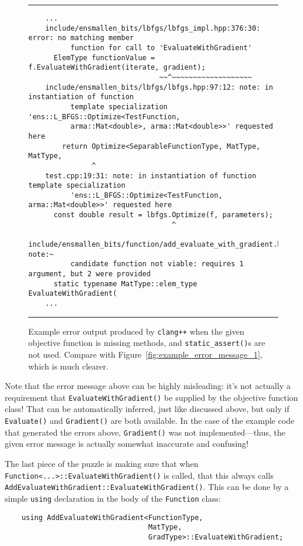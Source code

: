 \begin{figure}[!tb]
\hrule
\vspace{1ex}
\begin{verbatim}
    ...
    include/ensmallen_bits/lbfgs/lbfgs_impl.hpp:376:30: error: no matching member
          function for call to 'EvaluateWithGradient'
      ElemType functionValue = f.EvaluateWithGradient(iterate, gradient);
                               ~~^~~~~~~~~~~~~~~~~~~~
    include/ensmallen_bits/lbfgs/lbfgs.hpp:97:12: note: in instantiation of function
          template specialization 'ens::L_BFGS::Optimize<TestFunction,
          arma::Mat<double>, arma::Mat<double>>' requested here
        return Optimize<SeparableFunctionType, MatType, MatType,
               ^
    test.cpp:19:31: note: in instantiation of function template specialization
          'ens::L_BFGS::Optimize<TestFunction, arma::Mat<double>>' requested here
      const double result = lbfgs.Optimize(f, parameters);
                                  ^
    include/ensmallen_bits/function/add_evaluate_with_gradient.hpp:225:38: note:~
          candidate function not viable: requires 1 argument, but 2 were provided
      static typename MatType::elem_type EvaluateWithGradient(
    ...
\end{verbatim}
\hrule
\caption{Example error output produced by {\tt clang++} when the given objective
function is missing methods, and {\tt static\_assert()}s are not used.  Compare
with Figure~\ref{fig:example_error_message_1}, which is much clearer.}
\label{fig:example_error_message_2}
\end{figure}

Note that the error message above can be highly misleading: it's not actually a
requirement that {\tt EvaluateWithGradient()} be supplied by the objective
function class!  That can be automatically inferred, just like discussed above,
but only if {\tt Evaluate()} and {\tt Gradient()} are both available.  In the
case of the example code that generated the errors above, {\tt Gradient()} was
not implemented---thus, the given error message is actually somewhat inaccurate
and confusing!

The last piece of the puzzle is making sure that when {\tt
Function<...>::EvaluateWithGradient()} is called, that this always calls {\tt
AddEvaluateWithGradient::EvaluateWithGradient()}.  This can be done by a simple
{\tt using} declaration in the body of the {\tt Function} class:

\begin{verbatim}
    using AddEvaluateWithGradient<FunctionType,
                                  MatType,
                                  GradType>::EvaluateWithGradient;
\end{verbatim}

